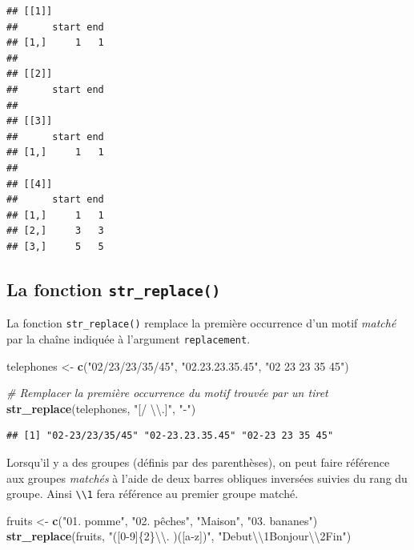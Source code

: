 \documentclass[
  11pt,
]{book}
\newenvironment{Shaded}{\begin{snugshade}}{\end{snugshade}}
\newcommand{\CharTok}[1]{\textcolor[rgb]{0.31,0.60,0.02}{#1}}
\newcommand{\CommentTok}[1]{\textcolor[rgb]{0.56,0.35,0.01}{\textit{#1}}}
\newcommand{\KeywordTok}[1]{\textcolor[rgb]{0.13,0.29,0.53}{\textbf{#1}}}
\newcommand{\NormalTok}[1]{#1}
\newcommand{\StringTok}[1]{\textcolor[rgb]{0.31,0.60,0.02}{#1}}
\numberwithin{equation}{section}
\numberwithin{countremarque}{section}
\begin{document}
\begin{lstlisting}
## [[1]]
##      start end
## [1,]     1   1
## 
## [[2]]
##      start end
## 
## [[3]]
##      start end
## [1,]     1   1
## 
## [[4]]
##      start end
## [1,]     1   1
## [2,]     3   3
## [3,]     5   5
\end{lstlisting}

\hypertarget{manip_regex_stringr_replace}{%
\subsection{\texorpdfstring{La fonction \texttt{str\_replace()}}{La fonction str\_replace()}}\label{manip_regex_stringr_replace}}

La fonction \texttt{str\_replace()} remplace la première occurrence d'un motif \emph{matché} par la chaîne indiquée à l'argument \texttt{replacement}.

\begin{Shaded}
\begin{Highlighting}[]
\NormalTok{telephones \textless{}{-}}\StringTok{ }\KeywordTok{c}\NormalTok{(}\StringTok{"02/23/23/35/45"}\NormalTok{, }\StringTok{"02.23.23.35.45"}\NormalTok{, }\StringTok{"02 23 23 35 45"}\NormalTok{)}

\CommentTok{\# Remplacer la première occurrence du motif trouvée par un tiret}
\KeywordTok{str\_replace}\NormalTok{(telephones, }\StringTok{"[/ }\CharTok{\textbackslash{}\textbackslash{}}\StringTok{.]"}\NormalTok{, }\StringTok{"{-}"}\NormalTok{)}
\end{Highlighting}
\end{Shaded}

\begin{lstlisting}
## [1] "02-23/23/35/45" "02-23.23.35.45" "02-23 23 35 45"
\end{lstlisting}

Lorsqu'il y a des groupes (définis par des parenthèses), on peut faire référence aux groupes \emph{matchés} à l'aide de deux barres obliques inversées suivies du rang du groupe. Ainsi \texttt{\textbackslash{}\textbackslash{}1} fera référence au premier groupe matché.

\begin{Shaded}
\begin{Highlighting}[]
\NormalTok{fruits \textless{}{-}}\StringTok{ }\KeywordTok{c}\NormalTok{(}\StringTok{"01. pomme"}\NormalTok{, }\StringTok{"02. pêches"}\NormalTok{, }\StringTok{"Maison"}\NormalTok{, }\StringTok{"03. bananes"}\NormalTok{)}
\KeywordTok{str\_replace}\NormalTok{(fruits, }\StringTok{"([0{-}9]\{2\}}\CharTok{\textbackslash{}\textbackslash{}}\StringTok{. )([a{-}z])"}\NormalTok{, }\StringTok{"Debut}\CharTok{\textbackslash{}\textbackslash{}}\StringTok{1Bonjour}\CharTok{\textbackslash{}\textbackslash{}}\StringTok{2Fin"}\NormalTok{)}
\end{Highlighting}
\end{Shaded}
\end{document}
